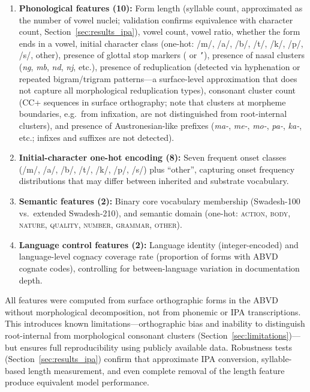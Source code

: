 \documentclass[12pt]{article}
\begin{document}
\begin{enumerate}
    \item \textbf{Phonological features (10):} Form length (syllable count, approximated as the number of vowel nuclei; validation confirms equivalence with character count, Section~\ref{sec:results_ipa}), vowel count, vowel ratio, whether the form ends in a vowel, initial character class (one-hot: /m/, /a/, /b/, /t/, /k/, /p/, /s/, other), presence of glottal stop markers ( or \texttt{'}), presence of nasal clusters (\textit{ng}, \textit{mb}, \textit{nd}, \textit{nj}, etc.), presence of reduplication (detected via hyphenation or repeated bigram/trigram patterns---a surface-level approximation that does not capture all morphological reduplication types), consonant cluster count (CC+ sequences in surface orthography; note that clusters at morpheme boundaries, e.g.\ from infixation, are not distinguished from root-internal clusters), and presence of Austronesian-like prefixes (\textit{ma-}, \textit{me-}, \textit{mo-}, \textit{pa-}, \textit{ka-}, etc.; infixes and suffixes are not detected).

    \item \textbf{Initial-character one-hot encoding (8):} Seven frequent onset classes (/m/, /a/, /b/, /t/, /k/, /p/, /s/) plus ``other'', capturing onset frequency distributions that may differ between inherited and substrate vocabulary.

    \item \textbf{Semantic features (2):} Binary core vocabulary membership (Swadesh-100 vs.\ extended Swadesh-210), and semantic domain (one-hot: \textsc{action}, \textsc{body}, \textsc{nature}, \textsc{quality}, \textsc{number}, \textsc{grammar}, \textsc{other}).

    \item \textbf{Language control features (2):} Language identity (integer-encoded) and language-level cognacy coverage rate (proportion of forms with ABVD cognate codes), controlling for between-language variation in documentation depth.
\end{enumerate}

All features were computed from surface orthographic forms in the ABVD without morphological decomposition, not from phonemic or IPA transcriptions.
This introduces known limitations---orthographic bias and inability to distinguish root-internal from morphological consonant clusters (Section~\ref{sec:limitations})---but ensures full reproducibility using publicly available data.
Robustness tests (Section~\ref{sec:results_ipa}) confirm that approximate IPA conversion, syllable-based length measurement, and even complete removal of the length feature produce equivalent model performance.
\end{document}
